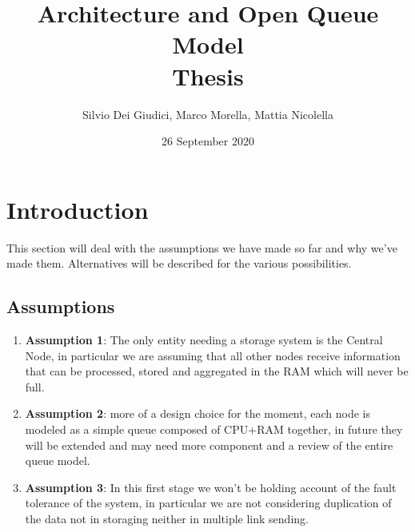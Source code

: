 \documentclass[11pt]{article}
\title {Architecture and Open Queue Model \\ \bigskip \large Thesis}
\author {Silvio Dei Giudici, Marco Morella, Mattia Nicolella}
\date{26 September 2020}
\begin{document}
\maketitle
\section{Introduction}
This section will deal with the assumptions we have made so far and why we've made them. Alternatives will be described for the various possibilities.\\
\subsection{Assumptions}
\begin{enumerate}
\item \textbf{Assumption 1}: The only entity needing a storage system is the Central Node, in particular we are assuming that all other nodes receive information that can be processed, stored and aggregated in the RAM which will never be full.
\item \textbf{Assumption 2}: more of a design choice for the moment, each node is modeled as a simple queue composed of CPU+RAM together, in future they will be extended and may need more component and a review of the entire queue model.
\item \textbf{Assumption 3}: In this first stage we won't be holding account of the fault tolerance of the system, in particular we are not considering duplication of the data not in storaging neither in multiple link sending.
\end{enumerate}
\end{document}
